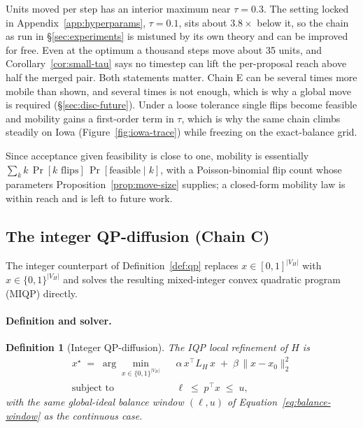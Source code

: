 \documentclass[11pt]{article}
\newtheorem{definition}{Definition}[section]
\begin{document}
Units moved per step has an interior maximum near $\tau = 0.3$. The
setting locked in Appendix~\ref{app:hyperparams}, $\tau = 0.1$, sits
about $3.8\times$ below it, so the chain as run in
\S\ref{sec:experiments} is mistuned by its own theory and can be
improved for free. Even at the optimum a thousand steps move about 35
units, and Corollary~\ref{cor:small-tau} says no timestep can lift the
per-proposal reach above half the merged pair. Both statements
matter. Chain E can be several times more mobile than shown, and
several times is not enough, which is why a global move is required
(\S\ref{sec:disc-future}). Under a loose tolerance single flips become
feasible and mobility gains a first-order term in $\tau$, which is why
the same chain climbs steadily on Iowa (Figure~\ref{fig:iowa-trace})
while freezing on the exact-balance grid.

Since acceptance given feasibility is close to one, mobility is
essentially $\sum_k k\,\Pr[k \text{ flips}]\,\Pr[\text{feasible} \mid
k]$, with a Poisson-binomial flip count whose parameters
Proposition~\ref{prop:move-size} supplies; a closed-form mobility law
is within reach and is left to future work.

\subsection{The integer QP-diffusion (Chain C)}\label{sec:iqp}

The integer counterpart of Definition~\ref{def:qp} replaces
$x \in [0,1]^{|V_H|}$ with $x \in \{0, 1\}^{|V_H|}$ and solves the
resulting mixed-integer convex quadratic program (MIQP) directly.

\paragraph{Definition and solver.}\label{sec:iqp-def}

\begin{definition}[Integer QP-diffusion]\label{def:iqp}
The IQP local refinement of $H$ is
\begin{align}
  x^\star \;=\; \arg\min_{x \in \{0,1\}^{|V_H|}} \;\;
    & \alpha\, x^\top L_H\, x \;+\; \beta\, \|x - x_0\|_2^2 \label{eq:iqp-obj} \\
  \text{subject to} \;\;
    & \ell \;\le\; p^\top x \;\le\; u,
\end{align}
with the same global-ideal balance window $(\ell, u)$ of
Equation~\eqref{eq:balance-window} as the continuous case.
\end{definition}
\end{document}
